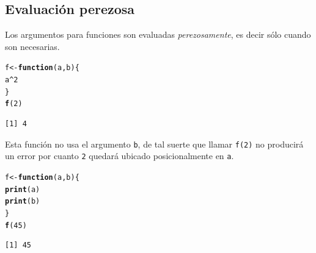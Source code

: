 \documentclass{article}\usepackage[]{graphicx}\usepackage[]{color}
\makeatletter
\newcommand{\hlnum}[1]{\textcolor[rgb]{0.686,0.059,0.569}{#1}}%
\newcommand{\hlopt}[1]{\textcolor[rgb]{0,0,0}{#1}}%
\newcommand{\hlstd}[1]{\textcolor[rgb]{0.345,0.345,0.345}{#1}}%
\newcommand{\hlkwa}[1]{\textcolor[rgb]{0.161,0.373,0.58}{\textbf{#1}}}%
\newcommand{\hlkwb}[1]{\textcolor[rgb]{0.69,0.353,0.396}{#1}}%
\newcommand{\hlkwc}[1]{\textcolor[rgb]{0.333,0.667,0.333}{#1}}%
\newcommand{\hlkwd}[1]{\textcolor[rgb]{0.737,0.353,0.396}{\textbf{#1}}}%
\newenvironment{kframe}{%
 \def\at@end@of@kframe{}%
 \ifinner\ifhmode%
  \def\at@end@of@kframe{\end{minipage}}%
  \begin{minipage}{\columnwidth}%
 \fi\fi%
 \def\FrameCommand##1{\hskip\@totalleftmargin \hskip-\fboxsep
 \colorbox{shadecolor}{##1}\hskip-\fboxsep
     \hskip-\linewidth \hskip-\@totalleftmargin \hskip\columnwidth}%
 \MakeFramed {\advance\hsize-\width
   \@totalleftmargin\z@ \linewidth\hsize
   \@setminipage}}%
 {\par\unskip\endMakeFramed%
 \at@end@of@kframe}
\newenvironment{knitrout}{}{} %
\makeatother
\begin{document}
  \subsection{Evaluación perezosa}
  Los argumentos para funciones son evaluadas \emph{perezosamente}, es decir sólo cuando son necesarias.
\begin{knitrout}
\color{fgcolor}\begin{kframe}
\begin{alltt}
  \hlstd{f} \hlkwb{<-} \hlkwa{function}\hlstd{(}\hlkwc{a}\hlstd{,} \hlkwc{b}\hlstd{)\{}
    \hlstd{a}\hlopt{^}\hlnum{2}
  \hlstd{\}}
  \hlkwd{f}\hlstd{(}\hlnum{2}\hlstd{)}
\end{alltt}
\begin{verbatim}
[1] 4
\end{verbatim}
\end{kframe}
\end{knitrout}
  Esta función no usa el argumento \texttt{b}, de tal suerte que llamar \texttt{f(2)} no producirá un error por cuanto \texttt{2} quedará ubicado posicionalmente en \texttt{a}.  
\begin{knitrout}
\color{fgcolor}\begin{kframe}
\begin{alltt}
  \hlstd{f} \hlkwb{<-} \hlkwa{function}\hlstd{(}\hlkwc{a}\hlstd{,} \hlkwc{b}\hlstd{)\{}
    \hlkwd{print}\hlstd{(a)}
    \hlkwd{print}\hlstd{(b)}
  \hlstd{\}}
  \hlkwd{f}\hlstd{(}\hlnum{45}\hlstd{)}
\end{alltt}
\begin{verbatim}
[1] 45
\end{verbatim}
\end{kframe}
\end{knitrout}
  
\end{document}
